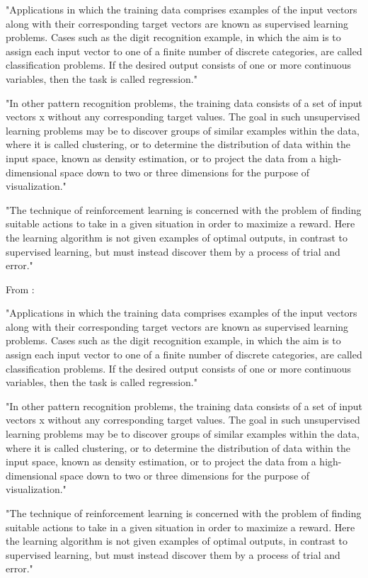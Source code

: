 "Applications in which the training data comprises examples of the input vectors along with their corresponding target vectors are known as supervised learning problems. Cases such as the digit recognition example, in which the aim is to assign each input vector to one of a finite number of discrete categories, are called classification problems. If the desired output consists of one or more continuous variables, then the task is called regression."

"In other pattern recognition problems, the training data consists of a set of input vectors x without any corresponding target values. The goal in such unsupervised learning problems may be to discover groups of similar examples within the data, where it is called clustering, or to determine the distribution of data within the input space, known as density estimation, or to project the data from a high-dimensional space down to two or three dimensions for the purpose of visualization."

"The technique of reinforcement learning is concerned with the problem of finding suitable actions to take in a given situation in order to maximize a reward. Here the learning algorithm is not given examples of optimal outputs, in contrast to supervised learning, but must instead discover them by a process of trial and error."

From \parencite{Goodfellow-et-al-2016} :

"Applications in which the training data comprises examples of the input vectors along with their corresponding target vectors are known as supervised learning problems. Cases such as the digit recognition example, in which the aim is to assign each input vector to one of a finite number of discrete categories, are called classification problems. If the desired output consists of one or more continuous variables, then the task is called regression."

"In other pattern recognition problems, the training data consists of a set of input vectors x without any corresponding target values. The goal in such unsupervised learning problems may be to discover groups of similar examples within the data, where it is called clustering, or to determine the distribution of data within the input space, known as density estimation, or to project the data from a high-dimensional space down to two or three dimensions for the purpose of visualization."

"The technique of reinforcement learning is concerned with the problem of finding suitable actions to take in a given situation in order to maximize a reward. Here the learning algorithm is not given examples of optimal outputs, in contrast to supervised learning, but must instead discover them by a process of trial and error."

